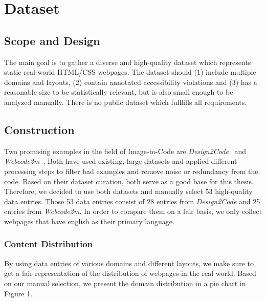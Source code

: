 \chapter{Dataset}\label{chapter:Dataset}

\section{Scope and Design}
The main goal is to gather a diverse and high-quality dataset which represents static
real-world HTML/CSS webpages. The dataset should (1) include multiple domains and layouts,
(2) contain annotated accessibility violations and (3) has a reasonable size to be
statistically relevant, but is also small enough to be analyzed manually.
There is no public dataset which fullfills all requirements.

\section{Construction}
Two promising examples in the field of Image-to-Code are \textit{Design2Code}~\parencite{si2024design2code} 
and \textit{Webcode2m}~\parencite{gui2024webcode2m}. 
Both have used existing, large datasets and applied different processing steps to 
filter bad examples and remove noise or redundancy from the code. Based on their
dataset curation, both serve as a good base for this thesis.\newline
Therefore, we decided to use both datasets and manually select 53 high-quality data 
entries. Those 53 data entries consist of 28 entries from \textit{Design2Code} and 25 entries
from \textit{Webcode2m}. In order to compare them on a fair basis, we only collect webpages 
that have english as their primary language.

\subsection{Content Distribution}
By using data entries of various domains and different layouts, we make sure to get 
a fair representation of the distribution of webpages in the real world. Based on 
our manual selection, we present the domain distribution in a pie chart in Figure 1.

